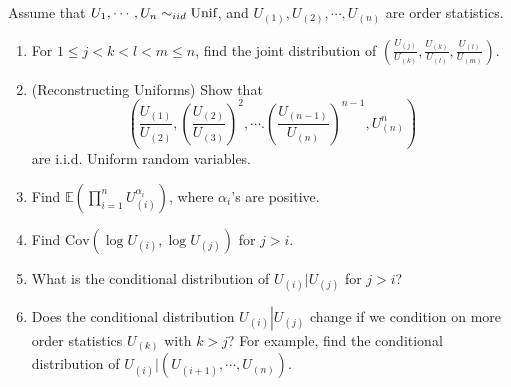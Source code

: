 \documentclass[
  letterpaper,
  DIV=11,
  numbers=noendperiod]{scrreprt}
\theoremstyle{definition}
\theoremstyle{plain}
\theoremstyle{remark}
\begin{document}
Assume that \(U_1, \cdots, U_n \sim_{iid} \textnormal{Unif}\), and
\(U_{(1)},U_{(2)},\cdots, U_{(n)}\) are order statistics.

\begin{enumerate}
\def\labelenumi{(\alph{enumi})}
\item
  For \(1 \leq j < k < l < m \leq n\), find the joint distribution of
  \(\left( \frac{U_{(j)}}{U_{(k)}}, \frac{U_{(k)}}{U_{(l)}}, \frac{U_{(l)}}{U_{(m)}}\right).\)
\item
  (Reconstructing Uniforms) Show that
  \[\left( \frac{U_{(1)}}{U_{(2)}}, \left(\frac{U_{(2)}}{U_{(3)}}\right)^2,\cdots. \left(\frac{U_{(n-1)}}{U_{(n)}}\right)^{n-1}, U_{(n)}^n \right)\]
  are i.i.d. Uniform random variables.
\item
  Find \(\mathbb{E}\left(\prod_{i=1}^{n} U^{\alpha_i}_{(i)}\right)\),
  where \(\alpha_i\)'s are positive.
\item
  Find \(\mathrm{Cov}\left(\log U_{(i)}, \log U_{(j)}\right)\) for
  \(j > i\).
\item
  What is the conditional distribution of \(U_{(i)} | U_{(j)}\) for
  \(j > i\)?
\item
  Does the conditional distribution \(U_{(i)}\left|U_{(j)}\right.\)
  change if we condition on more order statistics \(U_{(k)}\) with
  \(k > j\)? For example, find the conditional distribution of
  \(U_{(i)}| (U_{(i+1)},\cdots, U_{(n)}).\)
\end{enumerate}
\end{document}
